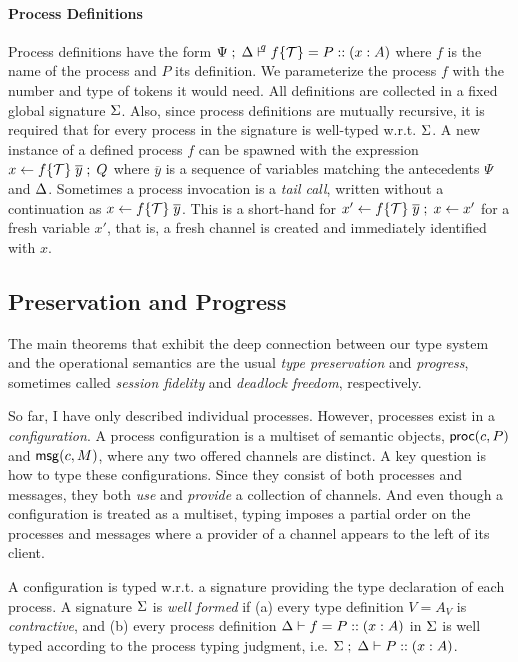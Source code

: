 \paragraph*{\textbf{Process Definitions}}
Process definitions have the form
$\Psi \semi \D \entailpot{q} f\{\Tokens\} = P :: (x : A)$ where $f$
is the name of the process and $P$ its definition.
We parameterize the process $f$ with the number and type of
tokens it would need.
All definitions are collected in a fixed global signature $\Sg$.
Also, since process definitions are mutually recursive, it is required that
for every process in the signature is well-typed w.r.t. $\Sg$.
A new instance of a defined process $f$ can be spawned with
the expression $\procdef{f\{\Tokens\}}{\overline{y}}{x} \semi Q$
where $\overline{y}$ is a sequence of variables matching the
antecedents $\Psi$ and $\D$.
Sometimes a process invocation is a \emph{tail call}, written without
a continuation as $\procdef{f\{\Tokens\}}{\overline{y}}{x}$.
This is a short-hand for
$\procdef{f\{\Tokens\}}{\overline{y}}{x'} \semi \fwd{x}{x'}$ for a
fresh variable $x'$, that is, a fresh channel is created and
immediately identified with $x$.

\subsection{Preservation and Progress}
The main theorems that exhibit the deep connection between our type
system and the operational semantics are the usual \emph{type
  preservation} and \emph{progress}, sometimes called \emph{session
  fidelity} and \emph{deadlock freedom}, respectively.

So far, I have only described individual processes. However, processes
exist in a \emph{configuration}. A process configuration is a multiset
of semantic objects, $\proc{c}{P}$ and $\msg{c}{M}$, where any
two offered channels are distinct. A key question is how to type these
configurations. Since they consist of both processes and messages, they
both \emph{use} and \emph{provide} a collection of channels.
And even though a configuration is treated as a multiset, typing imposes
a partial order on the processes and messages where a provider of a
channel appears to the left of its client.

A configuration is typed w.r.t. a signature providing the type declaration
of each process.
A signature $\Sg$ is \emph{well formed} if
(a) every type definition $V = A_V$ is \emph{contractive},
and (b) every process definition
$\D \vdash f = P :: (x : A)$ in $\Sg$
is well typed according to the process typing judgment, i.e.
$\Sg \semi \D \vdash P :: (x : A)$.

